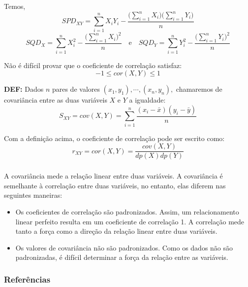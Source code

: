 \documentclass[14pt,aspectratio=1610]{beamer}
\begin{document}
\begin{frame}{}
\frametitle{}
\begin{block}{}
\justifying
Temos,
$$SPD_{XY}=\sum_{i=1}^{n}X_{i}Y_{i}-\dfrac{\Big({\displaystyle\sum_{i=1}^{n}X_{i}}\Big)\Big({\displaystyle\sum_{i=1}^{n}Y_{i}\Big)}}{n}$$
\pause
$$SQD_{X}=\displaystyle{\sum_{i=1}^{n}X_{i}^{2}}-\dfrac{\Big(\displaystyle{\sum_{i=1}^{n}X_{i}}\Big)^{2}}{n}\quad \textrm{e}\quad SQD_{Y}=\displaystyle{\sum_{i=1}^{n}Y_{i}^{2}}-\dfrac{\Big(\displaystyle{\sum_{i=1}^{n}Y_{i}}\Big)^{2}}{n}$$
\end{block}
\pause
\vspace{-0.06cm}
\begin{block}{}
\justifying
Não é difícil provar que o coeficiente de correlação satisfaz:
$$-1\leq cor(X,Y)\leq 1$$
\end{block}
\end{frame}

\begin{frame}{}
    \begin{block}{}
\justifying
{\bf DEF:} Dados $n$ pares de valores $(x_{1}, y_{1}), \cdots, (x_{n}, y_{n}),$ chamaremos de covariância entre as duas variáveis $X$ e $Y$ a igualdade:
$$S_{XY}=cov(X,Y)={\displaystyle \sum_{i=1}^{n}\dfrac{(x_{i}-\bar{x})(y_{i}-\bar{y})}{n}}$$
\end{block}
\pause
\begin{block}{}
\justifying
Com a definição acima, o coeficiente de correlação pode ser escrito como:
$$r_{XY}=cor(X,Y)=\dfrac{cov(X,Y)}{dp(X)dp(Y)}$$
\end{block}
\end{frame}

\begin{frame}{}
\frametitle{}
\begin{block}{}
\justifying
A covariância mede a relação linear entre duas variáveis. A covariância é semelhante à correlação entre duas variáveis, no entanto, elas diferem nas seguintes maneiras:
\end{block}
\pause
\begin{block}{}
\justifying
\begin{itemize}
\item Os coeficientes de correlação são padronizados. Assim, um relacionamento linear perfeito resulta em um coeficiente de correlação 1. A correlação mede tanto a força como a direção da relação linear entre duas variáveis.
\end{itemize}
\end{block}
\pause
\begin{block}{}
\justifying
\begin{itemize}
\item Os valores de covariância não são padronizados. Como os dados não são padronizadas, é difícil determinar a força da relação entre as variáveis.
\end{itemize}
\nocite{Apostila}
\end{block}
\end{frame}

\begin{frame}%
\frametitle{\bf Referências}

\end{frame}
\end{document}
